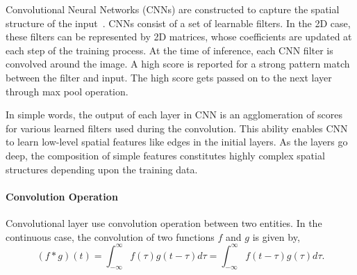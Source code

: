 Convolutional Neural Networks (CNNs) are constructed to capture the spatial structure of the input~\cite{krizhevsky2012imagenet}.
CNNs consist of a set of learnable filters. In the 2D case, these filters can be represented by 2D matrices, whose coefficients are updated at each step of the training process. At the time of inference, each CNN filter is convolved around the image. A high score is reported for a strong pattern match between the filter and input. The high score gets passed on to the next layer through max pool operation.

In simple words, the output of each layer in CNN is an agglomeration of scores for various learned filters used during the convolution. This ability enables CNN to learn low-level spatial features like edges in the initial layers. As the layers go deep, the composition of simple features constitutes highly complex spatial structures depending upon the training data. 

\paragraph{Convolution Operation}
Convolutional layer use convolution operation between two entities. In the continuous case, the convolution of two functions $f$ and $g$ is given by,
\begin{equation}
    (f*g)(t) = \int_{-\infty}^{\infty} f(\tau)g(t-\tau)d\tau = \int_{-\infty}^{\infty} f(t-\tau)g(\tau)d\tau.
\end{equation}

